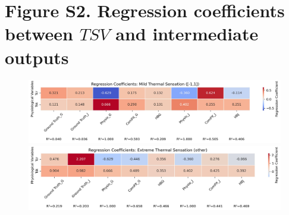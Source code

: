 \documentclass[1p]{elsarticle}
\begin{document}
\section*{Figure S2. Regression coefficients between $TSV$ and intermediate outputs}
\begin{figure}[H]
    \centering
    \includegraphics[width=\linewidth]{figures/regression_coef_Mild Thermal Sensation ([-1,1]).jpg}
    \includegraphics[width=\linewidth]{figures/regression_coef_Extreme Thermal Sensation (other).jpg}
    \label{fig:regre-co}
\end{figure}
\end{document}

